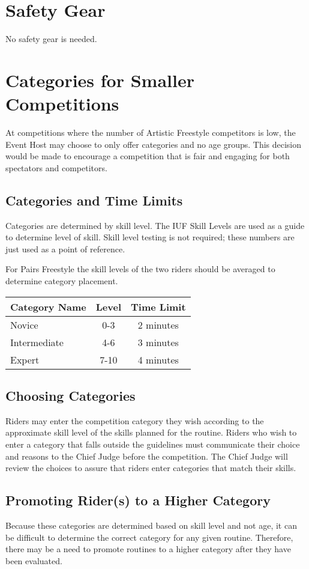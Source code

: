 \section{Safety Gear}
No safety gear is needed.

\section{Categories for Smaller Competitions}
At competitions where the number of Artistic Freestyle competitors is low, the Event Host may choose to only offer categories and no age groups.
This decision would be made to encourage a competition that is fair and engaging for both spectators and competitors.

\subsection{Categories and Time Limits}
Categories are determined by skill level.
The IUF Skill Levels are used as a guide to determine level of skill.
Skill level testing is not required; these numbers are just used as a point of reference.

For Pairs Freestyle the skill levels of the two riders should be averaged to determine category placement.

\begin{tabular}{|l|c|c|}
\hline
\textbf{Category Name} & \textbf{Level} & \textbf{Time Limit} \\
\hline
Novice & 0-3 & 2 minutes \\
\hline
Intermediate & 4-6 & 3 minutes \\
\hline
Expert & 7-10 & 4 minutes \\
\hline
\end{tabular}
 
\subsection{Choosing Categories}
Riders may enter the competition category they wish according to the approximate skill
level of the skills planned for the routine.
Riders who wish to enter a category that falls outside the guidelines must communicate their choice and reasons to the Chief Judge before the competition.
The Chief Judge will review the choices to assure that riders enter categories that match their skills.

\subsection{Promoting Rider(s) to a Higher Category}
Because these categories are determined based on skill level and not age, it can be difficult to determine the correct category for any given routine.
Therefore, there may be a need to promote routines to a higher category after they have been evaluated.

